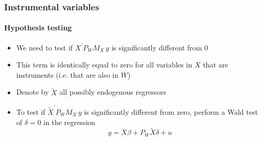 \documentclass[notes=show]{beamer}
\begin{document}
\begin{frame}\frametitle{Instrumental variables}\framesubtitle{Hypothesis testing}
\begin{itemize}
    \item We need to test if $X^{\prime }P_{W}M_{X}\,y$ is significantly different from 0
    \item This term is identically equal to zero for all variables in $X$ that are instruments (i.e. that are also in $W$)
    \item Denote by $\tilde{X}$ all possibly endogenous regressors
    \item To test if $\tilde{X}^{\prime }P_{W}M_{X}\,y$ is significantly different from zero, perform a Wald test of $\delta =0$ in the regression
    \begin{equation*}
        y=X\beta +P_{W}\tilde{X}\delta +u
    \end{equation*}
\end{itemize}
\end{frame}
\end{document}
